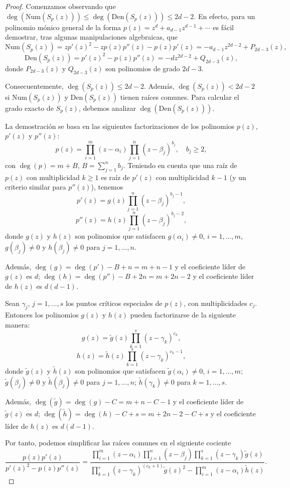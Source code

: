 \begin{proof}
Comenzamos observando que $\deg(\text{Num}(S_p(z)))\le \deg(\text{Den}(S_p(z)))\le 2d-2$. En efecto, para un polinomio mónico general de la forma $p(z)=z^d +a_{d-1} z^{d-1} + \cdots$ es fácil demostrar, tras algunas manipulaciones algebraicas, que
$$ \text{Num}(S_p(z))=zp'(z)^2-zp(z)p''(z)-p(z)p'(z)=-a_{d-1}z^{2d-2}+P_{2d-3}(z), $$
$$ \text{Den}(S_p(z))=p'(z)^2-p(z)p''(z)=-dz^{2d-2}+Q_{2d-3}(z),$$
donde $P_{2d-3}(z)$ y $Q_{2d-3}(z)$ son polinomios de grado $2d-3$.

Consecuentemente, $\deg(S_p(z))\le 2d-2$. Además, $\deg(S_p(z))< 2d-2$ si $\text{Num}(S_p(z))$ y $\text{Den}(S_p(z))$ tienen raíces comunes. Para calcular el grado exacto de $S_p(z)$, debemos analizar $\deg(\text{Den}(S_p(z)))$.

La demostración se basa en las siguientes factorizaciones de los polinomios $p(z)$, $p'(z)$ y $p''(z)$:
\[
p(z)=\prod_{i=1}^m(z-\alpha_i)\prod_{j=1}^n(z-\beta_j)^{b_j},\quad b_j\ge 2,
\]
con $\deg(p)=m+B$, $B=\sum_{j=1}^n b_j.$ Teniendo en cuenta que una raíz de $p(z)$ con multiplicidad $k\ge 1$ es raíz de $p'(z)$ con multiplicidad $k-1$ (y un criterio similar para $p''(z)$), tenemos
$$p'(z)=g(z)\prod_{j=1}^n(z-\beta_j)^{b_j-1},$$
$$p''(z)=h(z)\prod_{j=1}^n(z-\beta_j)^{b_j-2},$$
donde $g(z)$ y $h(z)$ son polinomios que satisfacen $g(\alpha_i)\ne 0$, $i=1,\dots, m$, $g(\beta_j)\ne0$ y $h(\beta_j)\ne 0$ para $j=1,\dots, n$.

Además, $\deg(g)=\deg(p')-B+n=m+n-1$ y el coeficiente líder de $g(z)$ es $d$; $\deg(h)=\deg(p'')-B+2n=m+2n-2$ y el coeficiente líder de $h(z)$ es $d(d-1)$.

Sean $\gamma_j$, $j=1,\dots, s$ los puntos críticos especiales de $p(z)$, con multiplicidades $c_j$. Entonces los polinomios $g(z)$ y $h(z)$ pueden factorizarse de la siguiente manera:
$$g(z)=\tilde{g}(z)\prod_{k=1}^s(z-\gamma_k)^{c_k},$$
$$h(z)=\tilde{h}(z)\prod_{k=1}^s(z-\gamma_k)^{c_k-1},$$
donde $\tilde{g}(z)$ y $\tilde{h}(z)$ son polinomios que satisfacen $\tilde{g}(\alpha_i)\ne 0$, $i=1,\dots, m$; $\tilde{g}(\beta_j)\ne0$ y $\tilde{h}(\beta_j)\ne 0$ para $j=1,\dots, n$; $\tilde{h}(\gamma_k)\ne 0$ para $k=1,\dots, s$.

Además, $\deg(\tilde{g})=\deg(g)-C=m+n-C-1$ y el coeficiente líder de $\tilde{g}(z)$ es $d$; $\deg(\tilde{h})=\deg(h)-C+s=m+2n-2-C+s$ y el coeficiente líder de $h(z)$ es $d(d-1)$.

Por tanto, podemos simplificar las raíces comunes en el siguiente cociente
$$
\frac{p(z)p'(z)}{p'(z)^2- p(z)p''(z)}=\dfrac{\prod_{i=1}^m(z-\alpha_i)\prod_{j=1}^n(z-\beta_j) \prod_{k=1}^s(z-\gamma_k) \tilde{g}(z)}
{\prod_{k=1}^s(z-\gamma_k)^{(c_k+1)} \tilde{g}(z)^2-\prod_{i=1}^m(z-\alpha_i)\tilde{h}(z)}.
$$


\end{proof}
